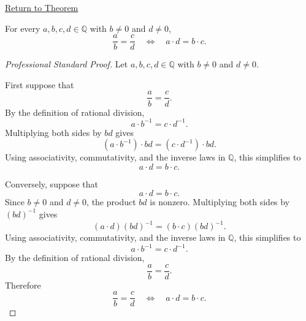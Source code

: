 \newpage
{}
\label{prf:rational-cross-multiplication}

\begin{remark*}[Return]
\hyperref[thm:rational-cross-multiplication]{Return to Theorem}
\end{remark*}

\begin{theorem*}
For every $a,b,c,d\in\mathbb{Q}$ with $b\neq 0$ and $d\neq 0$,
\[
\frac{a}{b}=\frac{c}{d}
\quad\Longleftrightarrow\quad
a\cdot d=b\cdot c.
\]
\end{theorem*}

\begin{proof}[Professional Standard Proof]
\LRAProofBodyStart
Let $a,b,c,d\in\mathbb{Q}$ with $b\neq 0$ and $d\neq 0$.

First suppose that
\[
\frac{a}{b}=\frac{c}{d}.
\]
By the definition of rational division,
\[
a\cdot b^{-1}=c\cdot d^{-1}.
\]
Multiplying both sides by $bd$ gives
\[
(a\cdot b^{-1})\cdot bd=(c\cdot d^{-1})\cdot bd.
\]
Using associativity, commutativity, and the inverse laws in $\mathbb{Q}$,
this simplifies to
\[
a\cdot d=b\cdot c.
\]

Conversely, suppose that
\[
a\cdot d=b\cdot c.
\]
Since $b\neq 0$ and $d\neq 0$, the product $bd$ is nonzero. Multiplying
both sides by $(bd)^{-1}$ gives
\[
(a\cdot d)(bd)^{-1}=(b\cdot c)(bd)^{-1}.
\]
Using associativity, commutativity, and the inverse laws in $\mathbb{Q}$,
this simplifies to
\[
a\cdot b^{-1}=c\cdot d^{-1}.
\]
By the definition of rational division,
\[
\frac{a}{b}=\frac{c}{d}.
\]
Therefore
\[
\frac{a}{b}=\frac{c}{d}
\quad\Longleftrightarrow\quad
a\cdot d=b\cdot c.
\]
\end{proof}

